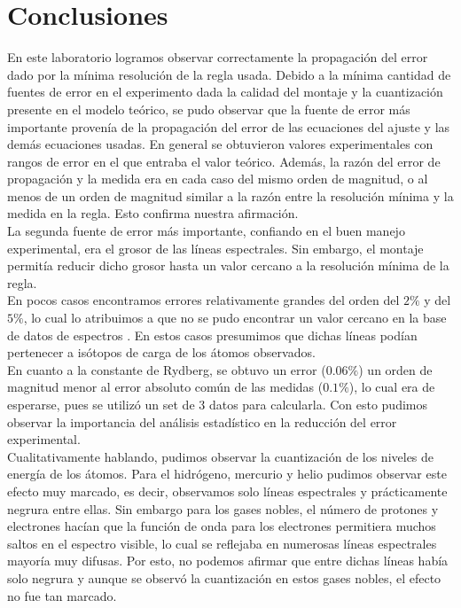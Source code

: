 \documentclass[%
 reprint,
 amsmath,amssymb,
 aps,
]{revtex4-1}
\begin{document}
\section{\label{sec:level1}Conclusiones}
En este laboratorio logramos observar correctamente la propagación del error dado por la mínima resolución de la regla usada. Debido a la mínima cantidad de fuentes de error en el experimento dada la calidad del montaje y la cuantización presente en el modelo teórico, se pudo observar que la fuente de error más importante provenía de la propagación del error de las ecuaciones del ajuste y las demás ecuaciones usadas. En general se obtuvieron valores experimentales con rangos de error en el que entraba el valor teórico. Además, la razón del error de propagación y la medida era en cada caso del mismo orden de magnitud, o al menos de un orden de magnitud similar a la razón entre la resolución mínima y la medida en la regla. Esto confirma nuestra afirmación.\\

La segunda fuente de error más importante, confiando en el buen manejo experimental, era el grosor de las líneas espectrales. Sin embargo, el montaje permitía reducir dicho grosor hasta un valor cercano a la resolución mínima de la regla.\\

En pocos casos encontramos errores relativamente grandes del orden del $2\%$ y del $5\%$, lo cual lo atribuimos a que no se pudo encontrar un valor cercano en la base de datos de espectros \cite{base}. En estos casos presumimos que dichas líneas podían pertenecer a isótopos de carga de los átomos observados.\\

En cuanto a la constante de Rydberg, se obtuvo un error ($0.06\%$) un orden de magnitud menor al error absoluto común de las medidas ($0.1\%$), lo cual era de esperarse, pues se utilizó un set de 3 datos para calcularla. Con esto pudimos observar la importancia del análisis estadístico en la reducción del error experimental.\\

Cualitativamente hablando, pudimos observar la cuantización de los niveles de energía de los átomos. Para el hidrógeno, mercurio y helio pudimos observar este efecto muy marcado, es decir, observamos solo líneas espectrales y prácticamente negrura entre ellas. Sin embargo para los gases nobles, el número de protones y electrones hacían que la función de onda para los electrones permitiera muchos saltos en el espectro visible, lo cual se reflejaba en numerosas líneas espectrales mayoría muy difusas. Por esto, no podemos afirmar que entre dichas líneas había solo negrura y aunque se observó la cuantización en estos gases nobles, el efecto no fue tan marcado.\\
\end{document}
